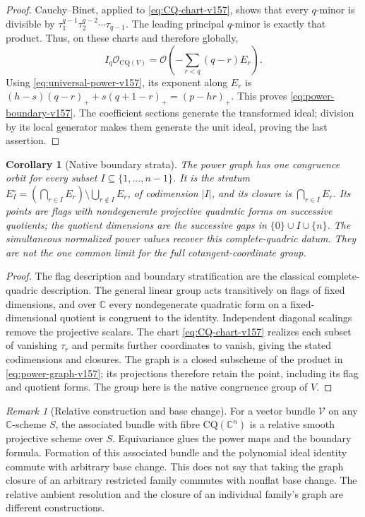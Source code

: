 \documentclass[11pt,reqno]{amsart}
\numberwithin{equation}{section}
\newtheorem{corollary}[theorem]{Corollary}
\theoremstyle{definition}\newtheorem{definition}[theorem]{Definition}
\theoremstyle{remark}\newtheorem{remark}[theorem]{Remark}
\newcommand{\C}{\mathbb C}\newcommand{\Q}{\mathbb Q}
\newcommand{\OO}{\mathcal O}\newcommand{\II}{\mathcal I}
\begin{document}
\begin{proof}
Cauchy--Binet, applied to \eqref{eq:CQ-chart-v157}, shows that every
$q$-minor is divisible by
$\tau_1^{q-1}\tau_2^{q-2}\cdots\tau_{q-1}$.
The leading principal $q$-minor is exactly that product. Thus, on
these charts and therefore globally,
\begin{equation}\label{eq:minors-on-CQ-v157}
 I_q\OO_{\mathrm{CQ}(V)}=
              \OO\left(-\sum_{r<q}(q-r)E_r\right).
\end{equation}
Using \eqref{eq:universal-power-v157}, its exponent along $E_r$ is
$(h-s)(q-r)_++s(q+1-r)_+=(p-hr)_+$.
This proves \eqref{eq:power-boundary-v157}. The coefficient sections
generate the transformed ideal; division by its local generator makes
them generate the unit ideal, proving the last assertion.
\end{proof}

\begin{corollary}[Native boundary strata]
\label{cor:native-strata-v157}
The power graph has one congruence orbit for every subset
$I\subseteq\{1,\ldots,n-1\}$. It is the stratum
$E_I^\circ=(\bigcap_{r\in I}E_r)\setminus\bigcup_{r\notin I}E_r$,
of codimension $|I|$, and its closure is $\bigcap_{r\in I}E_r$.
Its points are flags with nondegenerate projective quadratic forms on
successive quotients; the quotient dimensions are the successive gaps
in $\{0\}\cup I\cup\{n\}$. The simultaneous normalized power values
recover this complete-quadric datum. They are not the one common limit
for the full cotangent-coordinate group.
\end{corollary}
\begin{proof}
The flag description and boundary stratification are the classical
complete-quadric description. The general linear group acts transitively
on flags of fixed dimensions, and over $\C$ every nondegenerate
quadratic form on a fixed-dimensional quotient is congruent to the
identity. Independent diagonal scalings remove the projective scalars.
The chart \eqref{eq:CQ-chart-v157} realizes each subset of vanishing
$\tau_r$ and permits further coordinates to vanish, giving the stated
codimensions and closures. The graph is a closed subscheme of the
product in \eqref{eq:power-graph-v157}; its projections therefore
retain the point, including its flag and quotient forms. The group
here is the native congruence group of $V$.
\end{proof}

\begin{remark}[Relative construction and base change]
\label{rem:relative-CQ-v157}
For a vector bundle $\mathcal V$ on any $\C$-scheme $S$, the associated
bundle with fibre $\mathrm{CQ}(\C^n)$ is a relative smooth projective
scheme over $S$. Equivariance glues the power maps and the boundary
formula. Formation of this associated bundle and the polynomial ideal
identity commute with arbitrary base change. This does not say that
taking the graph closure of an arbitrary restricted family commutes
with nonflat base change. The relative ambient resolution and the
closure of an individual family's graph are different constructions.
\end{remark}
\end{document}

